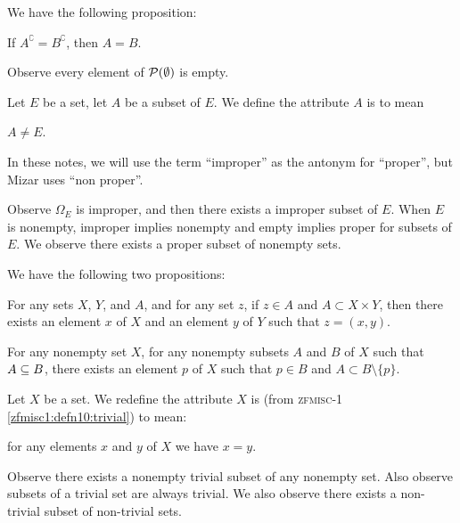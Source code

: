 \documentclass{article}
\begin{document}
We have the following proposition:
\begin{thm}
\item\label{subset1:42} If $A^{\complement}=B^{\complement}$, then $A=B$.
\end{thm}

Observe every element of $\mathcal{P}(\emptyset)$ is empty.

\begin{definition}
Let $E$ be a set, let $A$ be a subset of $E$. We define the attribute
$A$ is  to mean
\begin{defn}
\item $A\neq E$.
\end{defn}
In these notes, we will use the term ``improper'' as the antonym for
``proper'', but Mizar uses ``non proper''.
\end{definition}

Observe $\Omega_{E}$ is improper, and then there exists a improper
subset of $E$. When $E$ is nonempty, improper implies nonempty and
empty implies proper for subsets of $E$. We observe there exists a
proper subset of nonempty sets.

We have the following two propositions:
\begin{thm}
\item\label{subset1:43} For any sets $X$, $Y$, and $A$, and for any set $z$,
if $z\in A$ and $A\subset X\times Y$, then there exists an element $x$
of $X$ and an element $y$ of $Y$ such that $z=(x,y)$.
\item\label{subset1:44} For any nonempty set $X$, for any nonempty
  subsets $A$ and $B$ of $X$ such that $A\properSubset B$, there exists
  an element $p$ of $X$ such that $p\in B$ and $A\subset B\setminus\{p\}$.
\end{thm}

\begin{definition}
Let $X$ be a set. We redefine the attribute $X$ is 
(from \textsc{zfmisc-1} \eqref{zfmisc1:defn10:trivial}) to mean:
\begin{defn}
\item for any elements $x$ and $y$ of $X$ we have $x=y$.
\end{defn}
\end{definition}


Observe there exists a nonempty trivial subset of any nonempty set.
Also observe subsets of a trivial set are always trivial. We also
observe there exists a non-trivial subset of non-trivial sets.
\end{document}
